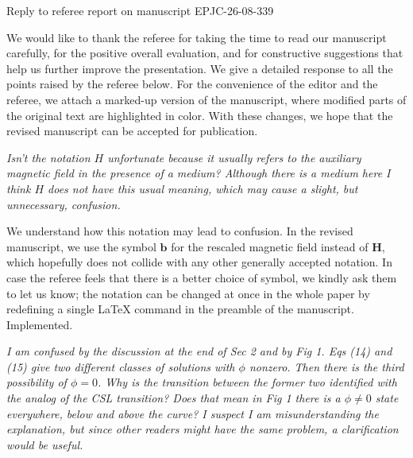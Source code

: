 \documentclass[11pt,a4paper]{article}
\newcommand{\vek}[1]{\bm{#1}}
\newcommand{\impl}{\textcolor{green!60!black}{Implemented.}}
\newcommand{\referee}[1]{\medskip\noindent{\sffamily\large #1)~Referee:}\par\smallskip}
\newcommand{\reply}{\par\medskip\noindent{\sffamily\large Reply:}\par\smallskip\noindent}
\newenvironment{reftext}{\itshape}{\par}
\begin{document}
\begin{center}
{\sffamily\LARGE Reply to referee report on manuscript EPJC-26-08-339}
\end{center}

\bigskip

\noindent We would like to thank the referee for taking the time to read our manuscript carefully, for the positive overall evaluation, and for constructive suggestions that help us further improve the presentation. We give a detailed response to all the points raised by the referee below. For the convenience of the editor and the referee, we attach a marked-up version of the manuscript, where modified parts of the original text are highlighted in color. With these changes, we hope that the revised manuscript can be accepted for publication.

\referee{1}
\begin{reftext}
Isn't the notation $H$ unfortunate because it usually refers to the auxiliary magnetic field in the presence of a medium? Although there is a medium here I think $H$ does not have this usual meaning, which may cause a slight, but unnecessary, confusion.
\end{reftext}

\reply
We understand how this notation may lead to confusion. In the revised manuscript, we use the symbol $\vek b$ for the rescaled magnetic field instead of $\vek H$, which hopefully does not collide with any other generally accepted notation. In case the referee feels that there is a better choice of symbol, we kindly ask them to let us know; the notation can be changed at once in the whole paper by redefining a single \LaTeX{} command in the preamble of the manuscript. \impl

\referee{2}
\begin{reftext}
I am confused by the discussion at the end of Sec 2 and by Fig 1. Eqs (14) and (15) give two different classes of solutions with $\phi$ nonzero. Then there is the third possibility of $\phi=0$. Why is the transition between the former two identified with the analog of the CSL transition? Does that mean in Fig 1 there is a $\phi\neq0$ state everywhere, below and above the curve? I suspect I am misunderstanding the explanation, but since other readers might have the same problem, a clarification would be useful.
\end{reftext}
\end{document}
